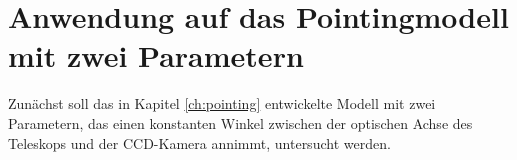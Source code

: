 \section{Anwendung auf das Pointingmodell mit zwei Parametern}
Zunächst soll das in Kapitel \ref{ch:pointing} entwickelte Modell mit zwei Parametern, das einen konstanten Winkel zwischen der optischen Achse des Teleskops und der CCD-Kamera annimmt, untersucht werden.
